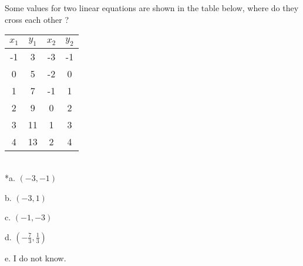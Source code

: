 
Some values for two linear equations are shown in the table below, where do they cross each other ? 

\begin{tabular}{ | c | c | c | c | }
\hline
\( x_{1} \) & \( y_{1} \)  & \( x_{2} \) &
\( y_{2} \) \\
\hline
-1 & 3 & -3 & -1 \\
\hline
0 & 5 & -2 & 0 \\
\hline
1 & 7 & -1 & 1 \\
\hline
2 & 9 & 0 & 2 \\
\hline
3 & 11 & 1 & 3\\
\hline
4 & 13 & 2 & 4\\
\hline
\end{tabular}
\\

*a. \( ( - 3, - 1 ) \)

b. \( ( - 3, 1 ) \)

c. \( ( - 1, - 3 ) \)

d. \( ( - \frac{7}{3}, \frac{1}{3} ) \)

e. I do not know.\\
